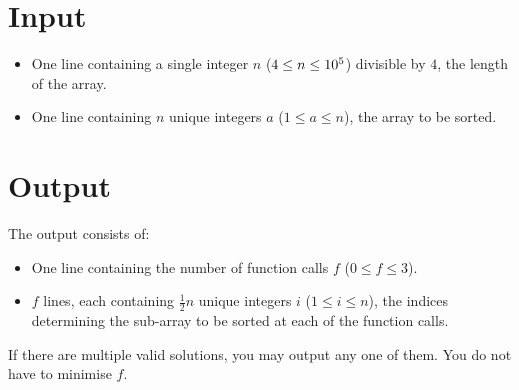 \section*{Input}
	\begin{itemize}
		\item One line containing a single integer $n$ ($4\leq n\leq 10^5$) divisible by $4$, the length of the array.
		\item One line containing $n$ unique integers $a$ ($1\leq a \leq n$), the array to be sorted.
	\end{itemize}

\section*{Output}
	The output consists of:
	\begin{itemize}
		\item One line containing the number of function calls $f$ ($0\leq f \leq 3$).
		\item $f$ lines, each containing $\tfrac{1}{2}n$ unique integers $i$ ($1\leq i \leq n$), the indices determining
			the sub-array to be sorted at each of the function calls.
	\end{itemize}
	If there are multiple valid solutions, you may output any one of them.
	You do not have to minimise $f$.

